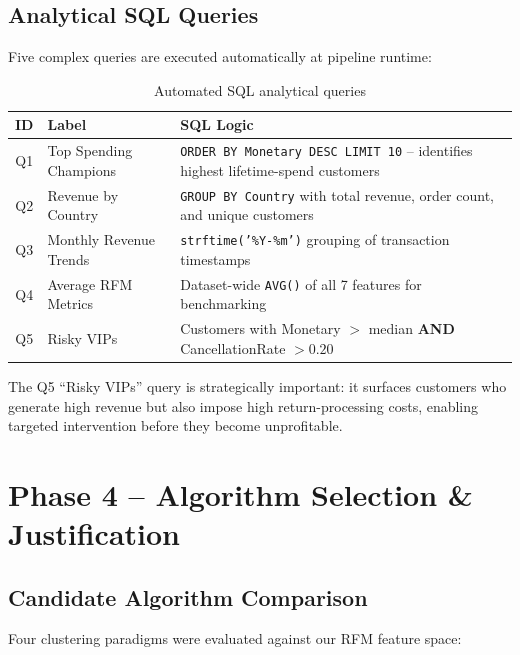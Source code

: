\documentclass[12pt,a4paper]{report}
\begin{document}
\section{Analytical SQL Queries}

Five complex queries are executed automatically at pipeline runtime:

\begin{table}[H]
\centering
\caption{Automated SQL analytical queries}
\begin{tabularx}{\textwidth}{clX}
\toprule
\textbf{ID} & \textbf{Label} & \textbf{SQL Logic} \\
\midrule
Q1 & Top Spending Champions & \texttt{ORDER BY Monetary DESC LIMIT 10} -- identifies highest lifetime-spend customers \\
Q2 & Revenue by Country & \texttt{GROUP BY Country} with total revenue, order count, and unique customers \\
Q3 & Monthly Revenue Trends & \texttt{strftime('\%Y-\%m')} grouping of transaction timestamps \\
Q4 & Average RFM Metrics & Dataset-wide \texttt{AVG()} of all 7 features for benchmarking \\
Q5 & Risky VIPs & Customers with Monetary $> $ median \textbf{AND} CancellationRate $> 0.20$ \\
\bottomrule
\end{tabularx}
\end{table}

The Q5 ``Risky VIPs'' query is strategically important: it surfaces customers who generate high revenue but also impose high return-processing costs, enabling targeted intervention before they become unprofitable.

\chapter{Phase 4 -- Algorithm Selection \& Justification}

\section{Candidate Algorithm Comparison}

Four clustering paradigms were evaluated against our RFM feature space:
\end{document}

